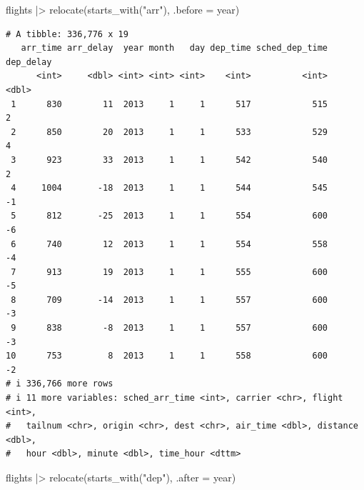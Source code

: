 \documentclass[
  letterpaper,
  DIV=11,
  numbers=noendperiod]{scrreprt}
\newenvironment{Shaded}{\begin{snugshade}}{\end{snugshade}}
\newcommand{\AttributeTok}[1]{\textcolor[rgb]{0.40,0.45,0.13}{#1}}
\newcommand{\FunctionTok}[1]{\textcolor[rgb]{0.28,0.35,0.67}{#1}}
\newcommand{\NormalTok}[1]{\textcolor[rgb]{0.00,0.23,0.31}{#1}}
\newcommand{\SpecialCharTok}[1]{\textcolor[rgb]{0.37,0.37,0.37}{#1}}
\newcommand{\StringTok}[1]{\textcolor[rgb]{0.13,0.47,0.30}{#1}}
\begin{document}
\begin{Shaded}
\begin{Highlighting}[]
\NormalTok{flights }\SpecialCharTok{|\textgreater{}}
  \FunctionTok{relocate}\NormalTok{(}\FunctionTok{starts\_with}\NormalTok{(}\StringTok{"arr"}\NormalTok{), }\AttributeTok{.before =}\NormalTok{ year)}
\end{Highlighting}
\end{Shaded}

\begin{verbatim}
# A tibble: 336,776 x 19
   arr_time arr_delay  year month   day dep_time sched_dep_time dep_delay
      <int>     <dbl> <int> <int> <int>    <int>          <int>     <dbl>
 1      830        11  2013     1     1      517            515         2
 2      850        20  2013     1     1      533            529         4
 3      923        33  2013     1     1      542            540         2
 4     1004       -18  2013     1     1      544            545        -1
 5      812       -25  2013     1     1      554            600        -6
 6      740        12  2013     1     1      554            558        -4
 7      913        19  2013     1     1      555            600        -5
 8      709       -14  2013     1     1      557            600        -3
 9      838        -8  2013     1     1      557            600        -3
10      753         8  2013     1     1      558            600        -2
# i 336,766 more rows
# i 11 more variables: sched_arr_time <int>, carrier <chr>, flight <int>,
#   tailnum <chr>, origin <chr>, dest <chr>, air_time <dbl>, distance <dbl>,
#   hour <dbl>, minute <dbl>, time_hour <dttm>
\end{verbatim}

\begin{Shaded}
\begin{Highlighting}[]
\NormalTok{flights }\SpecialCharTok{|\textgreater{}}
  \FunctionTok{relocate}\NormalTok{(}\FunctionTok{starts\_with}\NormalTok{(}\StringTok{"dep"}\NormalTok{), }\AttributeTok{.after =}\NormalTok{ year)}
\end{Highlighting}
\end{Shaded}
\end{document}
